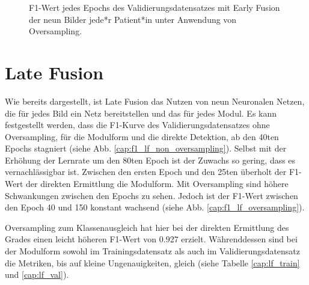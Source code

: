 \begin{figure}[b]\centering
\makebox[0pt]{}
\caption[F1-Wert jedes Epochs des Validierungsdatensatzes mit Early Fusion unter Anwendung von Oversampling]{F1-Wert jedes Epochs des Validierungsdatensatzes mit Early Fusion der neun Bilder jede*r Patient*in unter Anwendung von Oversampling.}\label{cap:f1_ef_oversampling}
\end{figure}\label{fig:f1_ef_oversampling}

\clearpage
\section{Late Fusion}\label{latefusion}
Wie bereits dargestellt, ist Late Fusion das Nutzen von neun Neuronalen Netzen, die für jedes Bild ein Netz bereitstellen und das für jedes Modul. Es kann festgestellt werden, dass die F1-Kurve des Validierungsdatensatzes ohne Oversampling, für die Modulform und die direkte Detektion, ab den 40ten Epochs stagniert (siehe Abb. \ref{cap:f1_lf_non_oversampling}). Selbst mit der Erhöhung der Lernrate um den 80ten Epoch ist der Zuwachs so gering, dass es vernachlässigbar ist. Zwischen den ersten Epoch und den 25ten überholt der F1-Wert der direkten Ermittlung die Modulform. Mit Oversampling sind höhere Schwankungen zwischen den Epochs zu sehen. Jedoch ist der F1-Wert zwischen den Epoch 40 und 150 konstant wachsend (siehe Abb. \ref{cap:f1_lf_oversampling}).

Oversampling zum Klassenausgleich hat hier bei der direkten Ermittlung des Grades einen leicht höheren F1-Wert von 0.927 erzielt. Währenddessen sind bei der Modulform sowohl im Trainingsdatensatz als auch im Validierungsdatensatz die Metriken, bis auf kleine Ungenauigkeiten, gleich (siehe Tabelle \ref{cap:lf_train} und \ref{cap:lf_val}).

